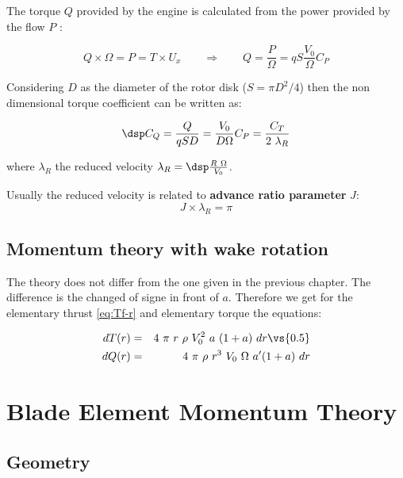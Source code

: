 The torque $Q$ provided by the engine is calculated from the  power provided by the flow $P$ :

$$ 
Q \times \Omega = P = T \times U_x \qquad  \Longrightarrow \qquad
Q =  \frac{P}{\Omega} = q S \frac{V_0}{\Omega} C_P
$$

Considering $D$ as the diameter of the rotor disk ($S = \pi D^2/4$) then the non dimensional torque coefficient can
be written as:

$$\dsp
C_Q = \frac{Q}{q S D} = \frac{V_0}{D \Omega} C_P = \frac{C_T}{2~\lambda_R}
$$

where $\lambda_R$  the reduced velocity $\lambda_R = \dsp \frac{R~\Omega}{V_0}$.

Usually the reduced velocity is related to  \textbf{advance ratio parameter} $J$:
$$
J \times \lambda_R = \pi
$$






\subsection{Momentum theory with wake rotation}

The theory does not differ from the one given in the previous chapter.
The difference is the changed of signe in front of $a$.
Therefore we get for the elementary thrust \eqref{eq:Tf-r} and elementary torque the equations:


\begin{eqnarray}
  dT(r) &=& 4~\pi~r~\rho~V_0^2~a~(1+a)~dr \label{eq:Tf-r2}  \vs{0.5} \\
  dQ(r) &=& 4~\pi~\rho~r^3~V_0~\Omega~a'(1+a)~dr \label{eq:def_dM2}
\end{eqnarray}

  


\section{Blade Element Momentum Theory}


\subsection{Geometry}

